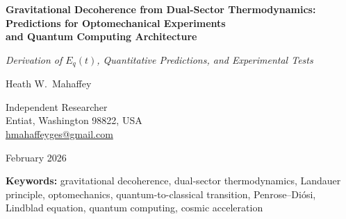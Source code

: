 \documentclass[12pt,letterpaper]{article}
\begin{document}
\doublespacing

\begin{titlepage}
\centering
\vspace*{2cm}

{\LARGE\bfseries Gravitational Decoherence from Dual-Sector Thermodynamics:\\[0.5em]
Predictions for Optomechanical Experiments\\
and Quantum Computing Architecture\par}

\vspace{1cm}
{\large\itshape Derivation of $E_q(t)$, Quantitative Predictions, and Experimental Tests\par}

\vspace{2cm}

{\large Heath W.\ Mahaffey\par}
\vspace{0.5cm}
{\normalsize Independent Researcher\\
Entiat, Washington 98822, USA\\
\href{mailto:hmahaffeyges@gmail.com}{hmahaffeyges@gmail.com}\par}

\vspace{1.5cm}
{\normalsize February 2026\par}

\vspace{2cm}


\begin{abstract}
We investigate gravitationally induced decoherence within a semiclassical
framework motivated by the Informational Actualization Model (IAM).
The analysis is formulated in the language of open quantum systems and
does not introduce objective collapse dynamics or non-unitary modifications
to the Schrödinger equation. Instead, gravitational interactions are treated
as an environment that can suppress off-diagonal elements of the reduced
density matrix through entanglement and coarse-graining.

We examine the scaling of the associated decoherence rate and its
thermodynamic interpretation, emphasizing consistency with energy
conservation, covariance, and existing experimental constraints.
The goal is not to resolve the measurement problem, but to clarify
the role of gravitational interactions in effective classicalization
processes relevant to macroscopic and cosmological systems.
\end{abstract}


\vspace{1cm}
{\small\noindent\textbf{Keywords:} gravitational decoherence, dual-sector
thermodynamics, Landauer principle, optomechanics, quantum-to-classical
transition, Penrose--Di\'{o}si, Lindblad equation, quantum computing,
cosmic acceleration\par}

\end{titlepage}
\end{document}

